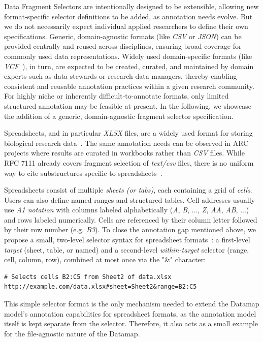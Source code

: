 \documentclass{jib}
\begin{document}
Data Fragment Selectors are intentionally designed to be extensible, allowing new format-specific selector definitions to be added, as annotation needs evolve. But we do not necessarily expect individual applied researchers to define their own specifications. Generic, domain-agnostic formats (like \emph{CSV} or \emph{JSON}) can be provided centrally and reused across disciplines, ensuring broad coverage for commonly used data representations. Widely used domain-specific formats (like \emph{VCF}~\cite{danecek2011vcf}), in turn, are expected to be created, curated, and maintained by domain experts such as data stewards or research data managers, thereby enabling consistent and reusable annotation practices within a given research community. For highly niche or inherently difficult-to-annotate formats, only limited structured annotation may be feasible at present. In the following, we showcase the addition of a generic, domain-agnostic fragment selector specification.

Spreadsheets, and in particular \emph{XLSX} files, are a widely used format for storing biological research data~\cite{ziemann2016excel}. 
The same annotation needs can be observed in ARC projects where results are curated in workbooks rather than \emph{CSV} files. While RFC 7111 already covers fragment selection of \emph{text/csv} files, there is no uniform way to cite substructures specific to spreadsheets~\cite{rfc7111}.

Spreadsheets consist of multiple \textit{sheets (or tabs)}, each containing a grid of \textit{cells}. Users can also define named ranges and structured tables. Cell addresses usually use \textit{A1 notation} with columns labeled alphabetically (\emph{A}, \emph{B}, ..., \emph{Z}, \emph{AA}, \emph{AB}, ...) and rows labeled numerically. Cells are referenced by their column letter followed by their row number (e.g. \emph{B3}). To close the annotation gap mentioned above, we propose a small, two-level selector syntax for spreadsheet formats~\cite{schneider2025spreadsheetfragment}: a first-level \textit{target} (sheet, table, or named) and a second-level \textit{within-target} selector (range, cell, column, row), combined at most once via the "\&" character:

\begin{verbatim}
# Selects cells B2:C5 from Sheet2 of data.xlsx
http://example.com/data.xlsx#sheet=Sheet2&range=B2:C5
\end{verbatim}

This simple selector format is the only mechanism needed to extend the Datamap model's annotation capabilities for spreadsheet formats, as the annotation model itself is kept separate from the selector. Therefore, it also acts as a small example for the file-agnostic nature of the Datamap.
\end{document}
